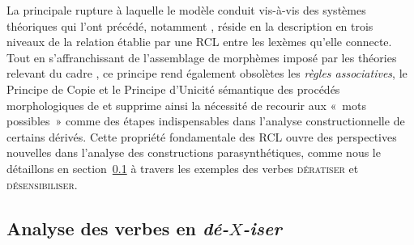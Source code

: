 \documentclass[output=paper]{langsci/langscibook}
\begin{document}
La principale rupture à laquelle le modèle conduit vis-à-vis des systèmes théoriques qui l'ont précédé, notamment \citet{Corbin87}, réside en la description en trois niveaux de la relation établie par une RCL entre les lexèmes qu'elle connecte.  Tout en s'affranchissant de l'assemblage de morphèmes imposé par les théories relevant du cadre \itemarr {}, ce principe rend également obsolètes les \emph{règles associatives}, le Principe de Copie  et le Principe d'Unicité sémantique des procédés morphologiques de \citet{Corbin87} et supprime ainsi la nécessité de recourir aux «~mots possibles~» comme des étapes indispensables dans l'analyse constructionnelle de certains dérivés.  Cette propriété fondamentale des RCL ouvre des perspectives nouvelles dans l'analyse des constructions parasynthétiques, comme nous le détaillons en section~\ref{sec:deXiser} à travers les exemples  des verbes \textsc{dératiser} et \textsc{désensibiliser}.

\subsection{Analyse des verbes en \emph{\mbox{dé-$X$-iser}}}
\label{sec:deXiser}

\end{document}
